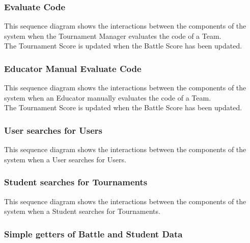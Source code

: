 \begin{landscape}
\clearpage
\subsubsection{Evaluate Code} \label{sq:13}
This sequence diagram shows the interactions between the components of the system when the Tournament Manager evaluates the code of a Team.\\
The Tournament Score is updated when the Battle Score has been updated.\\

\clearpage
\subsubsection{Educator Manual Evaluate Code} \label{sq:14}
This sequence diagram shows the interactions between the components of the system when an Educator manually evaluates the code of a Team.\\
The Tournament Score is updated when the Battle Score has been updated.\\

\clearpage
\subsubsection{User searches for Users}     \label{sq:15}
This sequence diagram shows the interactions between the components of the system when a User searches for Users.\\

\clearpage
\subsubsection{Student searches for Tournaments}    \label{sq:16}
This sequence diagram shows the interactions between the components of the system when a Student searches for Tournaments.\\

\clearpage
\subsubsection{Simple getters of Battle and Student Data}   \label{sq:17}
\end{landscape}
\clearpage

